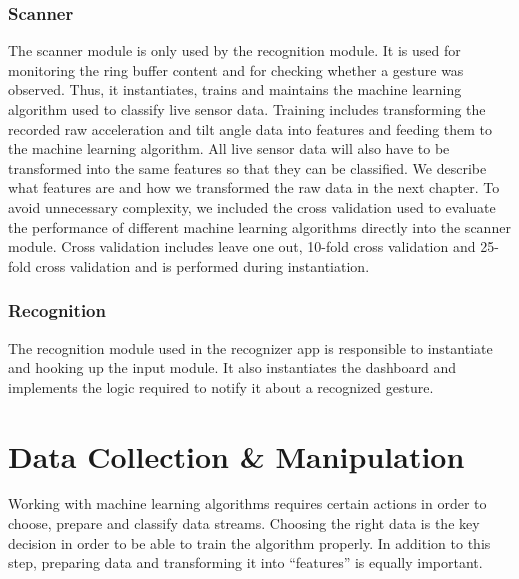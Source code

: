 \subsection{Scanner}
\label{ch:SystemDesign:sec:Components:sub:Scanner}

The scanner module is only used by the recognition module. It is used for monitoring the ring buffer content and for checking whether a gesture was observed. Thus, it instantiates, trains and maintains the machine learning algorithm used to classify live sensor data. Training includes transforming the recorded raw acceleration and tilt angle data into features and feeding them to the machine learning algorithm. All live sensor data will  also have to be transformed into the same features so that they can be classified. We describe what features are and how we transformed the raw data in the next chapter.
To avoid unnecessary complexity, we included the cross validation used to evaluate the performance of different machine learning algorithms directly into the scanner module. Cross validation includes leave one out, 10-fold cross validation and 25-fold cross validation and is performed during instantiation.


\subsection{Recognition}
\label{ch:SystemDesign:sec:Components:sub:Recognition}

The recognition module used in the recognizer app is responsible to instantiate and hooking up the input module. It also instantiates the dashboard and implements the logic required to notify it about a recognized gesture.

\chapter{Data Collection \& Manipulation}
\label{ch:DataCollection}

Working  with  machine  learning  algorithms  requires  certain  actions  in  order  to choose, prepare and classify data streams.
Choosing the right data is the key decision in order to be able to train the  algorithm properly.
In addition to this  step, preparing data and transforming it into “features” is equally important. 

